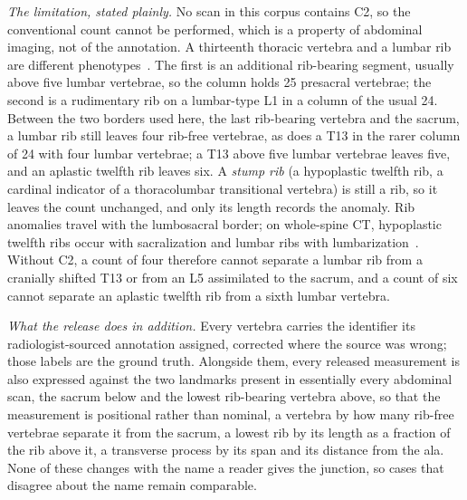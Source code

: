 \documentclass[aapm,mph,amsmath,amssymb,reprint]{revtex4-2}
\begin{document}
\emph{The limitation, stated plainly.} No scan in this corpus contains C2, so the
conventional count cannot be performed, which is a property of abdominal imaging, not of the annotation. A thirteenth thoracic vertebra and a lumbar rib are different
phenotypes~\cite{duplessis2018,poolman2023}. The first is an additional rib-bearing segment,
usually above five lumbar vertebrae, so the column holds 25 presacral vertebrae; the second
is a rudimentary rib on a lumbar-type L1 in a column of the usual 24. Between the two borders
used here, the last rib-bearing vertebra and the sacrum, a lumbar rib still leaves four
rib-free vertebrae, as does a T13 in the rarer column of 24 with four lumbar vertebrae; a T13
above five lumbar vertebrae leaves five, and an aplastic twelfth rib leaves six. A \emph{stump
rib} (a hypoplastic twelfth rib, a cardinal indicator of a thoracolumbar transitional
vertebra) is still a rib, so it leaves the count unchanged, and only its length records the
anomaly. Rib anomalies travel with the lumbosacral border; on whole-spine CT, hypoplastic
twelfth ribs occur with sacralization and lumbar ribs with lumbarization~\cite{nagata2025}.
Without C2, a count of four therefore cannot separate a lumbar rib from a cranially shifted
T13 or from an L5 assimilated to the sacrum, and a count of six cannot separate an aplastic
twelfth rib from a sixth lumbar vertebra.

\emph{What the release does in addition.} Every vertebra carries the identifier its
radiologist-sourced annotation assigned, corrected where the source was wrong; those labels
are the ground truth. Alongside them, every released measurement is also expressed against
the two landmarks present in essentially every abdominal scan, the sacrum below and the
lowest rib-bearing vertebra above, so that the measurement is positional rather than nominal, a vertebra by how many rib-free vertebrae
separate it from the sacrum, a lowest rib by its length as a fraction of the rib above it, a
transverse process by its span and its distance from the ala. None of these changes with the name a reader gives the junction, so cases that disagree about the name remain comparable.
\end{document}
